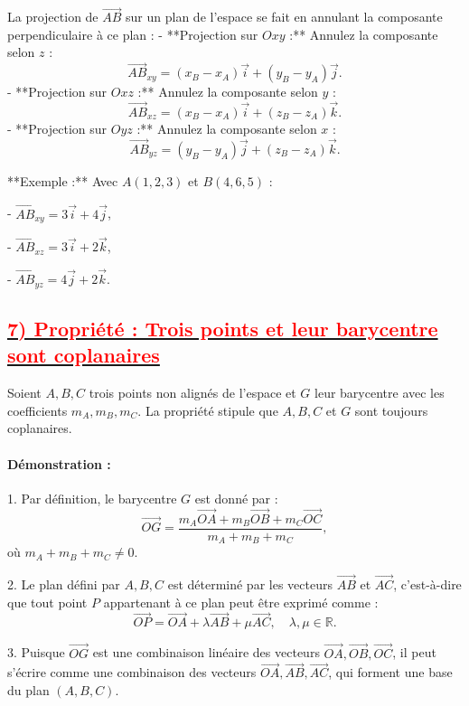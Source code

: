 \documentclass{article}
\begin{document}
La projection de \( \overrightarrow{AB} \) sur un plan de l’espace se fait en annulant la composante perpendiculaire à ce plan :  
- **Projection sur \( Oxy \) :**  
  Annulez la composante selon \( z \) :  
  \[
  \overrightarrow{AB}_{xy} = (x_B - x_A)\vec{i} + (y_B - y_A)\vec{j}.
  \]
- **Projection sur \( Oxz \) :**  
  Annulez la composante selon \( y \) :  
  \[
  \overrightarrow{AB}_{xz} = (x_B - x_A)\vec{i} + (z_B - z_A)\vec{k}.
  \]
- **Projection sur \( Oyz \) :**  
  Annulez la composante selon \( x \) :  
  \[
  \overrightarrow{AB}_{yz} = (y_B - y_A)\vec{j} + (z_B - z_A)\vec{k}.
  \]

**Exemple :**  
Avec \( A(1, 2, 3) \) et \( B(4, 6, 5) \) :  

- \( \overrightarrow{AB}_{xy} = 3\vec{i} + 4\vec{j} \),  

- \( \overrightarrow{AB}_{xz} = 3\vec{i} + 2\vec{k} \),  

- \( \overrightarrow{AB}_{yz} = 4\vec{j} + 2\vec{k} \).

\subsection*{\underline{\textbf{\textcolor{red}{7) Propriété : Trois points et leur barycentre sont coplanaires}}}}

Soient \( A, B, C \) trois points non alignés de l’espace et \( G \) leur barycentre avec les coefficients \( m_A, m_B, m_C \).  
La propriété stipule que \( A, B, C \) et \( G \) sont toujours coplanaires.

\paragraph{Démonstration :}  

1. Par définition, le barycentre \( G \) est donné par :  
   \[
   \overrightarrow{OG} = \frac{m_A\overrightarrow{OA} + m_B\overrightarrow{OB} + m_C\overrightarrow{OC}}{m_A + m_B + m_C},
   \]
   où \( m_A + m_B + m_C \neq 0 \).

2. Le plan défini par \( A, B, C \) est déterminé par les vecteurs \( \overrightarrow{AB} \) et \( \overrightarrow{AC} \), c'est-à-dire que tout point \( P \) appartenant à ce plan peut être exprimé comme :  
   \[
   \overrightarrow{OP} = \overrightarrow{OA} + \lambda \overrightarrow{AB} + \mu \overrightarrow{AC}, \quad \lambda, \mu \in \mathbb{R}.
   \]

3. Puisque \( \overrightarrow{OG} \) est une combinaison linéaire des vecteurs \( \overrightarrow{OA}, \overrightarrow{OB}, \overrightarrow{OC} \), il peut s'écrire comme une combinaison des vecteurs \( \overrightarrow{OA}, \overrightarrow{AB}, \overrightarrow{AC} \), qui forment une base du plan \( (A, B, C) \).
\end{document}
